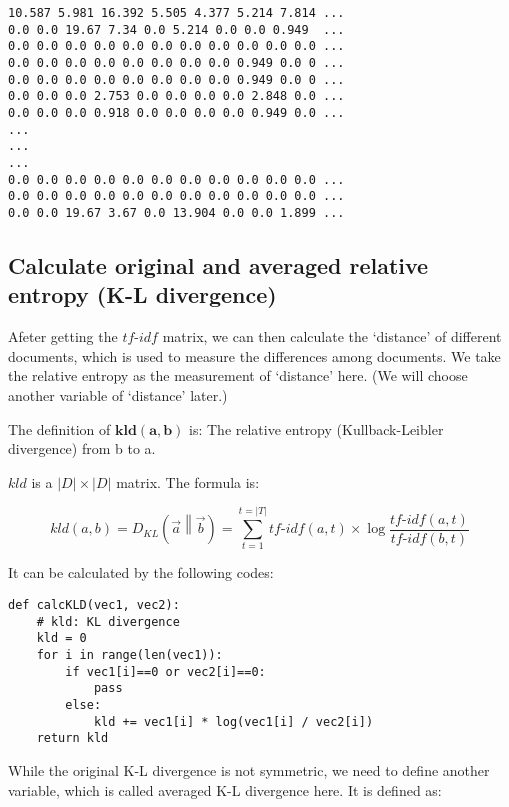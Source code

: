 \documentclass[a4paper, 12pt]{article}
\begin{document}
\begin{lstlisting}[style=plainText,caption={tf\_idf\_matrix.txt}]
10.587 5.981 16.392 5.505 4.377 5.214 7.814 ...
0.0 0.0 19.67 7.34 0.0 5.214 0.0 0.0 0.949  ...
0.0 0.0 0.0 0.0 0.0 0.0 0.0 0.0 0.0 0.0 0.0 ...
0.0 0.0 0.0 0.0 0.0 0.0 0.0 0.0 0.949 0.0 0 ...
0.0 0.0 0.0 0.0 0.0 0.0 0.0 0.0 0.949 0.0 0 ...
0.0 0.0 0.0 2.753 0.0 0.0 0.0 0.0 2.848 0.0 ...
0.0 0.0 0.0 0.918 0.0 0.0 0.0 0.0 0.949 0.0 ...
...
...
...
0.0 0.0 0.0 0.0 0.0 0.0 0.0 0.0 0.0 0.0 0.0 ...
0.0 0.0 0.0 0.0 0.0 0.0 0.0 0.0 0.0 0.0 0.0 ...
0.0 0.0 19.67 3.67 0.0 13.904 0.0 0.0 1.899 ...
\end{lstlisting}


\subsection{Calculate original and averaged relative entropy (K-L divergence)}

Afeter getting the $tf\text{-}idf$ matrix, we can then calculate the `distance' of different documents, which is used to measure the differences among documents. We take the relative entropy as the measurement of `distance' here. (We will choose another variable of `distance' later.)

The definition of $\bm{kld(a,b)}$ is: The relative entropy (Kullback-Leibler divergence) from b to a. 

$kld$ is a $|D| \times |D|$ matrix. The formula is:

$$kld(a,b) = D_{KL}\left(\overrightarrow{a} \middle\| \overrightarrow{b}\right) = \sum\limits_{t=1}^{t=|T|} tf\text{-}idf(a,t) \times \log \frac{tf\text{-}idf(a,t)}{tf\text{-}idf(b,t)}$$

It can be calculated by the following codes:

\begin{lstlisting}[style=myPython,caption={Calculate K-L divergence matrix}]
def calcKLD(vec1, vec2):
    # kld: KL divergence
    kld = 0
    for i in range(len(vec1)):
        if vec1[i]==0 or vec2[i]==0:
            pass
        else:
            kld += vec1[i] * log(vec1[i] / vec2[i])
    return kld
\end{lstlisting}

While the original K-L divergence is not symmetric, we need to define another variable, which is called averaged K-L divergence here. It is defined as:
\end{document}

